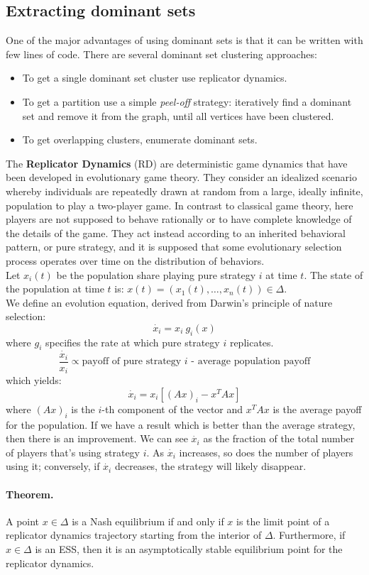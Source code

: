 \subsection{Extracting dominant sets}
One of the major advantages of using dominant sets is that it can be written with few lines of code. There are several dominant set clustering approaches:
\begin{itemize}
	\item To get a single dominant set cluster use replicator dynamics.
	\item To get a partition use a simple \textit{peel-off} strategy: iteratively find a dominant set and remove it from the graph, until all vertices have been clustered.
	\item To get overlapping clusters, enumerate dominant sets. 
\end{itemize}
The \textbf{Replicator Dynamics} (RD) are deterministic game dynamics that have been developed in evolutionary game theory. They consider an idealized scenario whereby individuals are repeatedly drawn at random from a large, ideally infinite, population to play a two-player game. In contrast to classical game theory, here players are not supposed to behave rationally or to have complete knowledge of the details of the game. They act instead according to an inherited behavioral pattern, or pure strategy, and it is supposed that some evolutionary selection process operates over time on the distribution of behaviors.\\
Let $x_i(t)$ be the population share playing pure strategy $i$ at time $t$. The state of the population at time $t$ is: $x(t) = (x_1(t),\dots,x_n(t))\in\Delta$.\\
We define an evolution equation, derived from Darwin's principle of nature selection:
$$\dot{x_i} = x_i~g_i(x)$$
where $g_i$ specifies the rate at which pure strategy $i$ replicates.
$$\frac{\dot{x_i}}{x_i} \propto \text{payoff of pure strategy }i\text{ - average population payoff}$$
which yields:
$$\dot{x_i} = x_i[(Ax)_i - x^TAx]$$
where $(Ax)_i$ is the $i$-th component of the vector and $x^TAx$ is the average payoff for the population. If we have a result which is better than the average strategy, then there is an improvement.
We can see $\dot{x_i}$ as the fraction of the total number of players that's using strategy $i$. As $\dot{x_i}$ increases, so does the number of players using it; conversely, if $\dot{x_i}$ decreases, the strategy will likely disappear.  

\paragraph{Theorem.} A point $x\in\Delta$ is a Nash equilibrium if and only if $x$ is the limit point of a replicator dynamics trajectory starting from the interior of $\Delta$.
Furthermore, if $x\in\Delta$ is an ESS, then it is an asymptotically stable equilibrium point for the replicator dynamics.\\

